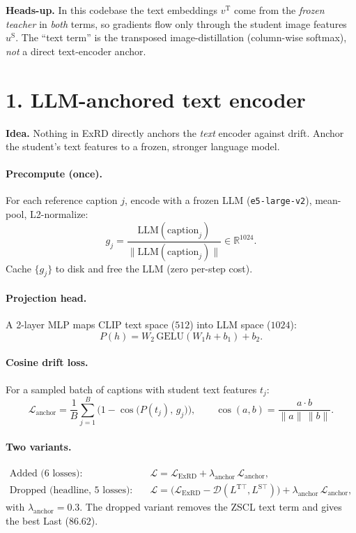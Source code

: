 \documentclass[11pt]{article}
\newcommand{\teach}{\mathrm{T}}
\newcommand{\stud}{\mathrm{S}}
\newcommand{\warn}[1]{\begin{mdframed}[backgroundcolor=red!6,linecolor=red!40]\textbf{Heads-up.} #1\end{mdframed}}
\begin{document}
\warn{In this codebase the text embeddings $v^{\teach}$ come from the \emph{frozen teacher} in
\emph{both} terms, so gradients flow only through the student image features $u^{\stud}$.
The ``text term'' is the transposed image-distillation (column-wise softmax), \emph{not} a
direct text-encoder anchor.}

\section*{1. LLM-anchored text encoder}

\textbf{Idea.} Nothing in ExRD directly anchors the \emph{text} encoder against drift. Anchor the
student's text features to a frozen, stronger language model.

\paragraph{Precompute (once).}
For each reference caption $j$, encode with a frozen LLM (\texttt{e5-large-v2}), mean-pool, L2-normalize:
\[
g_j = \frac{\text{LLM}(\text{caption}_j)}{\lVert \text{LLM}(\text{caption}_j)\rVert} \in \mathbb{R}^{1024}.
\]
Cache $\{g_j\}$ to disk and free the LLM (zero per-step cost).

\paragraph{Projection head.} A 2-layer MLP maps CLIP text space ($512$) into LLM space ($1024$):
\[
P(h) = W_2 \,\mathrm{GELU}(W_1 h + b_1) + b_2.
\]

\paragraph{Cosine drift loss.} For a sampled batch of captions with student text features $t_j$:
\[
\mathcal{L}_{\text{anchor}}
= \frac{1}{B}\sum_{j=1}^{B}\Big(1 - \cos\big(P(t_j),\, g_j\big)\Big),
\qquad
\cos(a,b) = \frac{a\cdot b}{\lVert a\rVert\,\lVert b\rVert}.
\]

\paragraph{Two variants.}
\begin{align}
\text{Added (6 losses):}\quad & \mathcal{L} = \mathcal{L}_{\text{ExRD}} + \lambda_{\text{anchor}}\,\mathcal{L}_{\text{anchor}}, \\
\text{Dropped (headline, 5 losses):}\quad & \mathcal{L} = \big(\mathcal{L}_{\text{ExRD}} - \mathcal{D}(L^{\teach\top}, L^{\stud\top})\big) + \lambda_{\text{anchor}}\,\mathcal{L}_{\text{anchor}},
\end{align}
with $\lambda_{\text{anchor}} = 0.3$. The dropped variant removes the ZSCL text term and gives the best Last ($86.62$).
\end{document}
